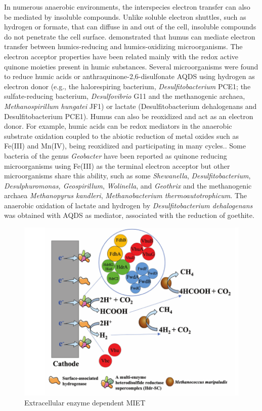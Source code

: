 \documentclass[fontsize=12pt,headsepline=true, bibliography=totocnumbered, twoside]{scrbook} %
\begin{document}
 In numerous anaerobic environments, the interspecies electron transfer can also be 
mediated by insoluble compounds.
 Unlike soluble electron shuttles, such as hydrogen or formate, that can diffuse 
 in and out of the cell, insoluble compounds do not penetrate the cell surface.
  \citet{lovley1999humics} demonstrated that humus can mediate electron transfer 
  between humics-reducing and humics-oxidizing microorganisms. The 
  electron acceptor properties have been related mainly with the redox active quinone
   moieties present in humic substances. Several microorganisms were found to reduce 
   humic acids or anthraquinone-2,6-disulfonate \ac{AQDS} using hydrogen as electron donor 
   (e.g., the halorespiring bacterium, \textit{Desulfitobacterium} PCE1; the sulfate-reducing bacterium,
    \textit{Desulfovibrio} G11 and the methanogenic archaea, \textit{Methanospirillum hungatei} JF1) or 
    lactate (Desulfitobacterium dehalogenans and Desulfitobacterium PCE1).\citep{cervantes2002reduction, martins2018methane}
     Humus can also be reoxidized and act as an electron donor. For example, 
     humic acids can be redox mediators in the anaerobic substrate oxidation coupled 
     to the abiotic reduction of metal oxides such as Fe(III) and Mn(IV), 
     being reoxidized and participating in many cycles.\citep{cervantes2002reduction, martins2018methane}. Some bacteria of 
     the genus \textit{Geobacter} have been reported as quinone reducing microorganisms 
     using Fe(III) as the terminal electron acceptor but other microorganisms 
     share this ability, such as some \textit{Shewanella}, \textit{Desulfitobacterium}, \textit{Desulphuromonas, Geospirillum},   
     \textit{Wolinella}, and \textit{Geothrix}\citep{lovley1998humic} and the methanogenic archaea \textit{Methanopyrus kandleri}, \textit{Methanobacterium thermoautotrophicum}. The anaerobic oxidation of lactate and hydrogen by \textit{Desulfitobacterium dehalogenans} was obtained with \ac{AQDS} as mediator, associated with the reduction of goethite\citep{martins2018methane}.
     
     
\begin{figure}
\center
\includegraphics[scale=0.7]{miet}
\caption[Extracellular enzyme dependent MIET]{Extracellular enzyme dependent MIET\citep{gao2021putative}}
\label{fg,miet}
\end{figure}
\end{document}
